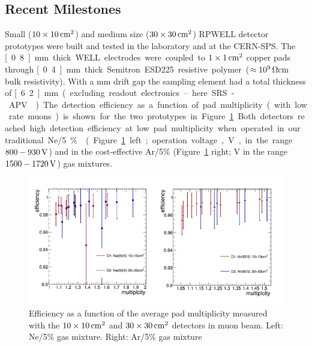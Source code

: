 \subsection{Recent Milestones}
Small ($\unit[10\times 10]{cm^2}$) and medium size ($\unit[30\times 30]{cm^2}$) RPWELL detector prototypes were built and tested in the laboratory and at the CERN-SPS. The \unit[0.8]{mm} thick WELL electrodes were coupled to $\unit[1\times 1]{cm^2}$ copper pads through \unit[0.4]{mm} thick Semitron ESD225 resistive polymer ($\approx \unit[10^9]{\Omega cm}$ bulk resistivity). With a \unit[5]{mm} drift gap the sampling element had a total thickness of \unit[6.2]{mm} (excluding readout electronics – here SRS-APV~\cite{1748-0221-8-03-C03015,French2001359}).
The detection efficiency as a function of pad multiplicity (with low rate muons) is shown for the two prototypes in Figure~\ref{fig:Calorimeter:THGEM:efficiencyVSMultiplicity}. Both detectors reached high detection efficiency at low pad multiplicity when operated in our traditional Ne/5\% (Figure~\ref{fig:Calorimeter:THGEM:efficiencyVSMultiplicity} left; operation voltage, V, in the range $800-\unit[930]{V}$) and in the cost-effective Ar/5\% (Figure~\ref{fig:Calorimeter:THGEM:efficiencyVSMultiplicity} right; V in the range $1500-\unit[1720]{V}$) gas mixtures.
\begin{figure}
	\centering
	\includegraphics[width=.9\textwidth]{Calorimeter/THGEM/efficiencyVSMultiplicity.png}
	\caption{Efficiency as a function of the average pad multiplicity measured with the $\unit[10\times 10]{cm^2}$ and $\unit[30\times 30]{cm^2}$ detectors in muon beam. Left: Ne/5\% gas mixture. Right: Ar/5\% gas mixture}
	\label{fig:Calorimeter:THGEM:efficiencyVSMultiplicity}
\end{figure}
